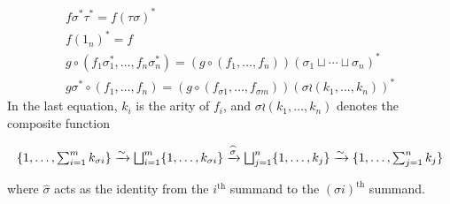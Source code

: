 \begin{definition}
\begin{enumerate}
     \begin{gather*}
       f \sigma^* \tau^* = f(\tau\sigma)^*\\
       f (1_n)^* = f\\
       g\circ (f_1 \sigma_1^* ,\dots, f_n \sigma_n^*) = (g \circ (f_1,\dots,f_n))(\sigma_1\sqcup \cdots \sqcup \sigma_n)^*\\
       g\sigma^* \circ (f_1,\dots,f_n) = (g\circ (f_{\sigma 1},\dots, f_{\sigma m}))(\sigma \wr (k_1,\dots,k_n))^*
     \end{gather*}
     In the last equation, $k_i$ is the arity of $f_i$, and $\sigma \wr (k_1,\dots,k_n)$ denotes the composite function
     \begin{footnotesize}
     \begin{equation*}
       \{1,\dots,\textstyle\sum_{i=1}^m k_{\sigma i} \}
       \xrightarrow{\sim} \bigsqcup_{i=1}^m \{1,\dots,k_{\sigma i}\}
       \xrightarrow{\widehat{\sigma}} \bigsqcup_{j=1}^n \{1,\dots,k_{j}\}
       \xrightarrow{\sim} \{1,\dots,\textstyle\sum_{j=1}^n k_j \}
     \end{equation*}
     \end{footnotesize}
     where $\widehat{\sigma}$ acts as the identity from the $i^{\mathrm{th}}$ summand to the $(\sigma i)^{\mathrm{th}}$ summand.
  \end{enumerate}
\end{definition}



